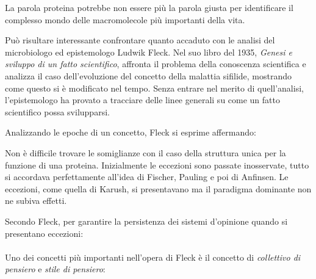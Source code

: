 {\par La parola proteina potrebbe non essere più la parola giusta per identificare il complesso mondo delle macromolecole più importanti della vita\supercite{parisi2021protein}. \\

\par Può risultare interessante confrontare quanto accaduto con le analisi del microbiologo ed epistemologo Ludwik Fleck\supercite{fleck_1983}. Nel suo libro del 1935, \textit{Genesi e sviluppo di un fatto scientifico}, affronta il problema della conoscenza scientifica e analizza il caso dell'evoluzione del concetto della malattia sifilide, mostrando come questo si è modificato nel tempo. Senza entrare nel merito di quell'analisi, l'epistemologo ha provato a tracciare delle linee generali su come un fatto scientifico possa svilupparsi.

\par Analizzando le epoche di un concetto, Fleck si esprime affermando:\\

Non è difficile trovare le somiglianze con il caso della struttura unica per la funzione di una proteina. Inizialmente le eccezioni sono passate inosservate, tutto si accordava perfettamente all'idea di Fischer, Pauling e poi di Anfinsen. Le eccezioni, come quella di Karush, si presentavano ma il paradigma dominante non ne subiva effetti.

Secondo Fleck, per garantire la persistenza dei sistemi d'opinione quando si presentano eccezioni:\\
\\

Uno dei concetti più importanti nell'opera di Fleck è il concetto di \textit{collettivo di pensiero} e \textit{stile di pensiero}:\\

}
